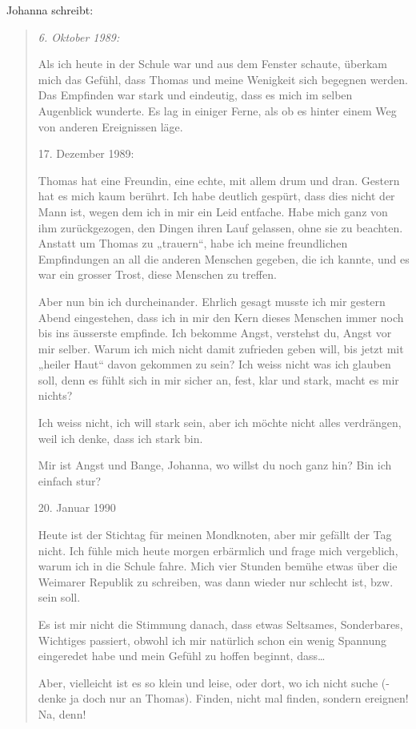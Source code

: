 \documentclass[10pt,titlepage,a5paper]{book}
\newenvironment{tg}{\begin{quote}\em}{\end{quote}}
\begin{document}
Johanna schreibt:
\begin{tg}
6. Oktober 1989:

Als ich heute in der Schule war und aus dem Fenster schaute, überkam mich das Gefühl, dass Thomas und meine Wenigkeit sich begegnen werden. Das Empfinden war stark und eindeutig, dass es mich im selben Augenblick wunderte. Es lag in einiger Ferne, als ob es hinter einem Weg von anderen Ereignissen läge.

17. Dezember 1989:

Thomas hat eine Freundin, eine echte, mit allem drum und dran. Gestern hat es mich kaum berührt. Ich habe deutlich gespürt, dass dies nicht der Mann ist, wegen dem ich in mir ein Leid entfache. Habe mich ganz von ihm zurückgezogen, den Dingen ihren Lauf gelassen, ohne sie zu beachten. Anstatt um Thomas zu „trauern“, habe ich meine freundlichen Empfindungen an all die anderen Menschen gegeben, die ich kannte, und es war ein grosser Trost, diese Menschen zu treffen.

Aber nun bin ich durcheinander. Ehrlich gesagt musste ich mir gestern Abend eingestehen, dass ich in mir den Kern dieses Menschen immer noch bis ins äusserste empfinde. Ich bekomme Angst, verstehst du, Angst vor mir selber. Warum ich mich nicht damit zufrieden geben will, bis jetzt mit „heiler Haut“ davon gekommen zu sein? Ich weiss nicht was ich glauben soll, denn es fühlt sich in mir sicher an, fest, klar und stark, macht es mir nichts?

Ich weiss nicht, ich will stark sein, aber ich möchte nicht alles verdrängen, weil ich denke, dass ich stark bin.

Mir ist Angst und Bange, Johanna, wo willst du noch ganz hin?
Bin ich einfach stur?

20. Januar 1990

Heute ist der Stichtag für meinen Mondknoten, aber mir gefällt der Tag nicht. Ich fühle mich heute morgen erbärmlich und frage mich vergeblich, warum ich in die Schule fahre. Mich vier Stunden bemühe etwas über die Weimarer Republik zu schreiben, was dann wieder nur schlecht ist, bzw. sein soll.

Es ist mir nicht die Stimmung danach, dass etwas Seltsames, Sonderbares, Wichtiges passiert, obwohl ich mir natürlich schon ein wenig Spannung eingeredet habe und mein Gefühl zu hoffen beginnt, dass\dots 

Aber, vielleicht ist es so klein und leise, oder dort, wo ich nicht suche (- denke ja doch nur an Thomas). Finden, nicht mal finden, sondern ereignen! Na, denn!


\end{tg}
\end{document}
